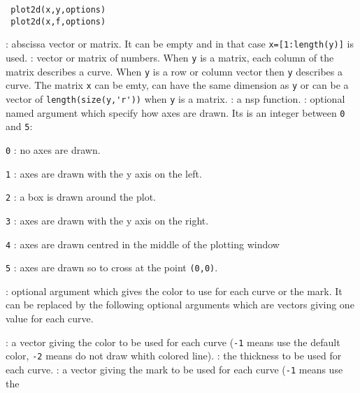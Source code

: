 \begin{mandesc}
\end{mandesc}

\begin{calling_sequence}
\begin{verbatim}
 plot2d(x,y,options)
 plot2d(x,f,options)
\end{verbatim}
\end{calling_sequence}
\begin{parameters}
  \begin{varlist}
    : abscissa vector or matrix. It can be empty and in that case
    \verb+x=[1:length(y)]+ is used.
    : vector or matrix of numbers. When \verb!y! is a matrix,
    each column of the matrix describes a curve. When \verb!y! is a row or
    column vector then \verb!y! describes a curve.
    The matrix \verb!x! can be emty, can have the same dimension as \verb!y!
    or can be a vector of \verb!length(size(y,'r'))! when \verb!y! is a matrix.
    : a nsp function.
    : optional named argument which specify how axes are drawn. Its is
    an integer between \verb+0+ and \verb+5+:
    \begin{varlist}
    \item \verb+0+ : no axes are drawn.
    \item \verb+1+ : axes are drawn with the y axis on the left.
    \item \verb+2+ : a box is drawn around the plot.
    \item \verb+3+ : axes are drawn with the y axis on the right.
    \item \verb+4+ : axes are drawn centred in the middle of the plotting window
    \item \verb+5+ : axes are drawn so to cross at the point \verb+(0,0)+.
    \end{varlist}
    : optional argument which gives the color to use for each curve or
    the mark. It can be replaced by the following optional arguments which are
    vectors giving one value for each curve.
    \begin{varlist}
    : a vector giving the color to be used for each curve (\verb!-1! means use the
    default color, \verb!-2! means do not draw whith colored line).
    : the thickness to be used for each curve.
    :  a vector giving the mark to be used for each curve (\verb!-1! means use the

\end{varlist}
\end{varlist}
\end{parameters}
